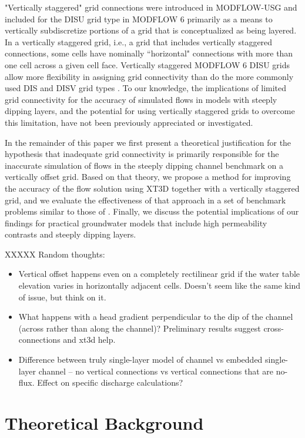 \documentclass{article}
\begin{document}
"Vertically staggered" grid connections were introduced in MODFLOW-USG \citep{modflowusg} and included for the DISU grid type in MODFLOW 6 \citep{modflow6gwf} primarily as a means to vertically subdiscretize portions of a grid that is conceptualized as being layered. In a vertically staggered grid, i.e., a grid that includes vertically staggered connections, some cells have nominally ``horizontal" connections with more than one cell across a given cell face. Vertically staggered MODFLOW 6 DISU grids allow more flexibility in assigning grid connectivity than do the more commonly used DIS and DISV grid types \citep{modflow6gwf}. To our knowledge, the implications of limited grid connectivity for the accuracy of simulated flows in models with steeply dipping layers, and the potential for using vertically staggered grids to overcome this limitation, have not been previously appreciated or investigated.

In the remainder of this paper we first present a theoretical justification for the hypothesis that inadequate grid connectivity is primarily responsible for the inaccurate simulation of flows in the steeply dipping channel benchmark on a vertically offset grid. Based on that theory, we propose a method for improving the accuracy of the flow solution using XT3D together with a vertically staggered grid, and we evaluate the effectiveness of that approach in a set of benchmark problems similar to those of \cite{bardot2022}. Finally, we discuss the potential implications of our findings for practical groundwater models that include high permeability contrasts and steeply dipping layers.

XXXXX Random thoughts:
\begin{itemize}
	\item Vertical offset happens even on a completely rectilinear grid if the water table elevation varies in horizontally adjacent cells. Doesn't seem like the same kind of issue, but think on it.
	\item What happens with a head gradient perpendicular to the dip of the channel (across rather than along the channel)? Preliminary results suggest cross-connections and xt3d help.
	\item Difference between truly single-layer model of channel vs embedded single-layer channel -- no vertical connections vs vertical connections that are no-flux. Effect on specific discharge calculations?
\end{itemize}

\section{Theoretical Background}
\end{document}
